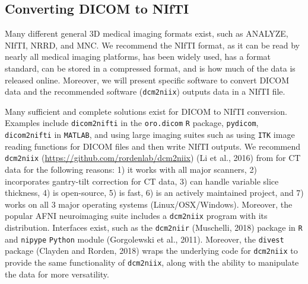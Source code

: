 \documentclass[utf8]{frontiersSCNS}
\begin{document}
\hypertarget{converting-dicom-to-nifti}{%
\subsection{Converting DICOM to NIfTI}\label{converting-dicom-to-nifti}}

Many different general 3D medical imaging formats exist, such as ANALYZE, NIfTI, NRRD, and MNC. We recommend the NIfTI format, as it can be read by nearly all medical imaging platforms, has been widely used, has a format standard, can be stored in a compressed format, and is how much of the data is released online. Moreover, we will present specific software to convert DICOM data and the recommended software (\texttt{dcm2niix}) outputs data in a NIfTI file.

Many sufficient and complete solutions exist for DICOM to NIfTI conversion. Examples include \texttt{dicom2nifti} in the \texttt{oro.dicom} \texttt{R} package, \texttt{pydicom}, \texttt{dicom2nifti} in \texttt{MATLAB}, and using large imaging suites such as using \texttt{ITK} image reading functions for DICOM files and then write NIfTI outputs. We recommend \texttt{dcm2niix} (\url{https://github.com/rordenlab/dcm2niix}) (Li et al., 2016) from for CT data for the following reasons: 1) it works with all major scanners, 2) incorporates gantry-tilt correction for CT data, 3) can handle variable slice thickness, 4) is open-source, 5) is fast, 6) is an actively maintained project, and 7) works on all 3 major operating systems (Linux/OSX/Windows). Moreover, the popular AFNI neuroimaging suite includes a \texttt{dcm2niix} program with its distribution. Interfaces exist, such as the \texttt{dcm2niir} (Muschelli, 2018) package in \texttt{R} and \texttt{nipype} \texttt{Python} module (Gorgolewski et al., 2011). Moreover, the \texttt{divest} package (Clayden and Rorden, 2018) wraps the underlying code for \texttt{dcm2niix} to provide the same functionality of \texttt{dcm2niix}, along with the ability to manipulate the data for more versatility.
\end{document}
